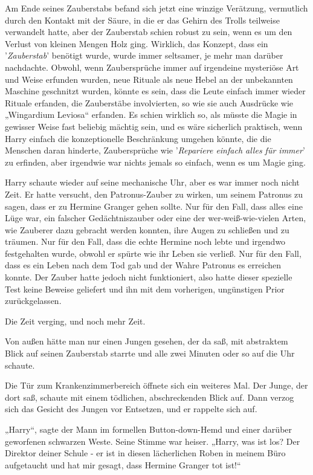 {Am Ende seines Zauberstabs befand sich jetzt eine winzige Verätzung, vermutlich durch den Kontakt mit der Säure, in die er das Gehirn des Trolls teilweise verwandelt hatte, aber der Zauberstab schien robust zu sein, wenn es um den Verlust von kleinen Mengen Holz ging. Wirklich, das Konzept, dass ein '\emph{Zauberstab}' benötigt wurde, wurde immer seltsamer, je mehr man darüber nachdachte. Obwohl, wenn Zaubersprüche immer auf irgendeine mysteriöse Art und Weise erfunden wurden, neue Rituale als neue Hebel an der unbekannten Maschine geschnitzt wurden, könnte es sein, dass die Leute einfach immer wieder Rituale erfanden, die Zauberstäbe involvierten, so wie sie auch Ausdrücke wie „Wingardium Leviosa“ erfanden. Es schien wirklich so, als müsste die Magie in gewisser Weise fast beliebig mächtig sein, und es wäre sicherlich praktisch, wenn Harry einfach die konzeptionelle Beschränkung umgehen könnte, die die Menschen daran hinderte, Zaubersprüche wie '\emph{Repariere einfach alles für immer}' zu erfinden, aber irgendwie war nichts jemals so einfach, wenn es um Magie ging.

Harry schaute wieder auf seine mechanische Uhr, aber es war immer noch nicht Zeit. Er hatte versucht, den Patronus-Zauber zu wirken, um seinem Patronus zu sagen, dass er zu Hermine Granger gehen sollte. Nur für den Fall, dass alles eine Lüge war, ein falscher Gedächtniszauber oder eine der wer-weiß-wie-vielen Arten, wie Zauberer dazu gebracht werden konnten, ihre Augen zu schließen und zu träumen. Nur für den Fall, dass die echte Hermine noch lebte und irgendwo festgehalten wurde, obwohl er spürte wie ihr Leben sie verließ. Nur für den Fall, dass es ein Leben nach dem Tod gab und der Wahre Patronus es erreichen konnte. Der Zauber hatte jedoch nicht funktioniert, also hatte dieser spezielle Test keine Beweise geliefert und ihn mit dem vorherigen, ungünstigen Prior zurückgelassen.

Die Zeit verging, und noch mehr Zeit.

Von außen hätte man nur einen Jungen gesehen, der da saß, mit abstraktem Blick auf seinen Zauberstab starrte und alle zwei Minuten oder so auf die Uhr schaute.

Die Tür zum Krankenzimmerbereich öffnete sich ein weiteres Mal. Der Junge, der dort saß, schaute mit einem tödlichen, abschreckenden Blick auf. Dann verzog sich das Gesicht des Jungen vor Entsetzen, und er rappelte sich auf.

„Harry“, sagte der Mann im formellen Button-down-Hemd und einer darüber geworfenen schwarzen Weste. Seine Stimme war heiser. „Harry, was ist los? Der Direktor deiner Schule - er ist in diesen lächerlichen Roben in meinem Büro aufgetaucht und hat mir gesagt, dass Hermine Granger tot ist!“

}
